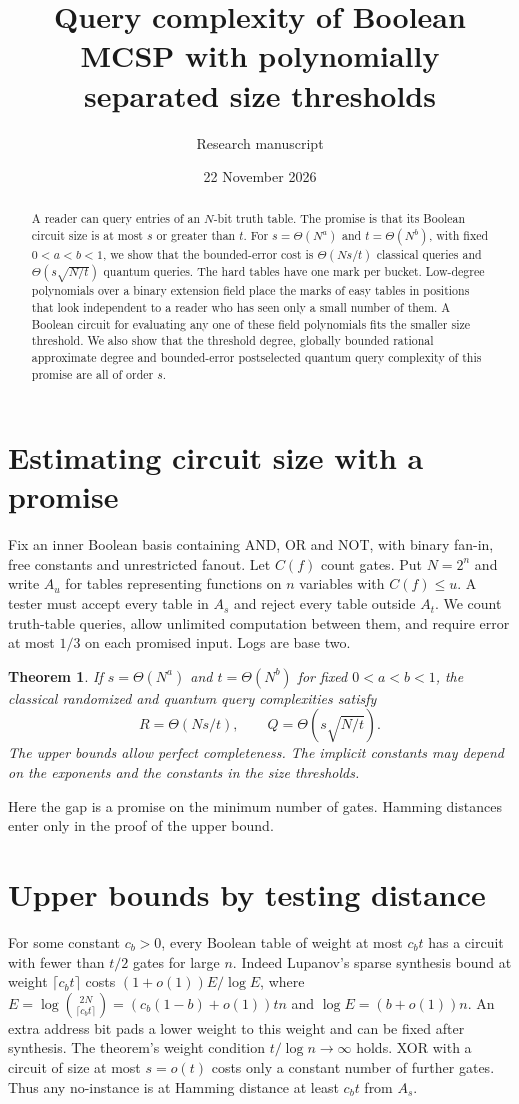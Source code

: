 \documentclass[11pt]{article}
\title{Query complexity of Boolean MCSP with polynomially separated size thresholds}
\author{Research manuscript}\date{22 November 2026}
\newtheorem{theorem}{Theorem}
\begin{document}
\maketitle
\begin{abstract}
A reader can query entries of an $N$-bit truth table. The promise is that its Boolean circuit size is at most $s$ or greater than $t$. For $s=\Theta(N^a)$ and $t=\Theta(N^b)$, with fixed $0<a<b<1$, we show that the bounded-error cost is $\Theta(Ns/t)$ classical queries and $\Theta(s\sqrt{N/t})$ quantum queries. The hard tables have one mark per bucket. Low-degree polynomials over a binary extension field place the marks of easy tables in positions that look independent to a reader who has seen only a small number of them. A Boolean circuit for evaluating any one of these field polynomials fits the smaller size threshold. We also show that the threshold degree, globally bounded rational approximate degree and bounded-error postselected quantum query complexity of this promise are all of order $s$.
\end{abstract}

\section{Estimating circuit size with a promise}
Fix an inner Boolean basis containing AND, OR and NOT, with binary fan-in, free constants and unrestricted fanout. Let $C(f)$ count gates. Put $N=2^n$ and write $A_u$ for tables representing functions on $n$ variables with $C(f)\le u$. A tester must accept every table in $A_s$ and reject every table outside $A_t$. We count truth-table queries, allow unlimited computation between them, and require error at most $1/3$ on each promised input. Logs are base two.
\begin{theorem}
If $s=\Theta(N^a)$ and $t=\Theta(N^b)$ for fixed $0<a<b<1$, the classical randomized and quantum query complexities satisfy
\[
                 R=\Theta(Ns/t),\qquad Q=\Theta(s\sqrt{N/t}).
\]
The upper bounds allow perfect completeness. The implicit constants may depend on the exponents and the constants in the size thresholds.
\end{theorem}
Here the gap is a promise on the minimum number of gates. Hamming distances enter only in the proof of the upper bound.
\section{Upper bounds by testing distance}
For some constant $c_b>0$, every Boolean table of weight at most $c_b t$ has a circuit with fewer than $t/2$ gates for large $n$. Indeed Lupanov's sparse synthesis bound \cite{kors} at weight $\lceil c_bt\rceil$ costs $(1+o(1))E/\log E$, where $E=\log\binom{2N}{\lceil c_bt\rceil}=(c_b(1-b)+o(1))tn$ and $\log E=(b+o(1))n$. An extra address bit pads a lower weight to this weight and can be fixed after synthesis. The theorem's weight condition $t/\log n\to\infty$ holds. XOR with a circuit of size at most $s=o(t)$ costs only a constant number of further gates. Thus any no-instance is at Hamming distance at least $c_b t$ from $A_s$.
\end{document}
